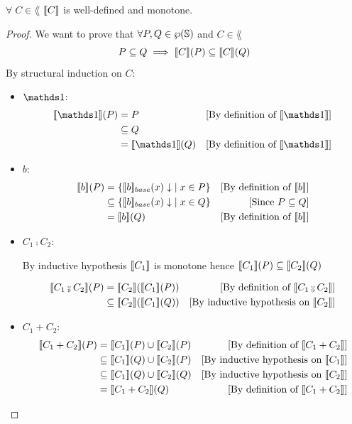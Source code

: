 \documentclass[
  10pt,       %
  twoside,    %
  a4paper,    %
  english,    %
  tikz,       %
  openright,  %
]{book}
\begin{document}
\begin{theorem}[Monotonicity]
  \label{thm:sem-mono}
  $\forall \; C \in \lang$ $\llbracket C \rrbracket$ is well-defined and monotone.
\end{theorem}
\begin{proof}
  We want to prove that $\forall P, Q \in \wp(\mathbb{S})$ and $C \in \lang$
  $$P \subseteq Q \implies \llbracket C \rrbracket(P) \subseteq \llbracket C \rrbracket(Q)$$
  By structural induction on $C$:
  \begin{itemize}
    \item $\sskip$:
      \begin{align*}
        \sem{\sskip}(P) 
          &= P
          & \text{[By definition of $\sem{\sskip}$]}\\
          &\subseteq Q \\
          &= \sem{\sskip}(Q) 
          & \text{[By definition of $\sem{\sskip}$]}\\
      \end{align*}

    \item $b$:
      \begin{align*}
        \llbracket b \rrbracket(P) 
          &= \{ \llbracket b \rrbracket_{base}(x)\downarrow \; \mid x \in P \} 
          & \text{[By definition of $\llbracket b \rrbracket$]}\\
          &\subseteq \{ \llbracket b \rrbracket_{base}(x)\downarrow \; \mid x \in Q \} 
          & \text{[Since $P \subseteq Q$]}\\
          &= \llbracket b \rrbracket(Q) 
          & \text{[By definition of $\llbracket b \rrbracket$]}\\
      \end{align*}

    \item $C_1 \fcmp C_2$:

      By inductive hypothesis $\llbracket C_1 \rrbracket$ is monotone hence
      $\llbracket C_1 \rrbracket(P) \subseteq \llbracket C_2 \rrbracket(Q)$

      \begin{align*}
        \sem{C_1 \fcmp C_2}(P) 
          &= \sem{C_2}(\sem{C_1}(P))
          &\text{[By definition of $\sem{C_1 \fcmp C_2}$]}\\
          &\subseteq \sem{C_2}(\sem{C_1}(Q))
          &\text{[By inductive hypothesis on $\sem{C_2}$]} \\
      \end{align*}
  
    \item $C_1 + C_2$:
      \begin{align*}
        \llbracket C_1 + C_2 \rrbracket(P) 
          &= \llbracket C_1 \rrbracket(P) \cup \llbracket C_2 \rrbracket(P)
          &\text{[By definition of $\llbracket C_1 + C_2 \rrbracket$]}\\
          &\subseteq \llbracket C_1 \rrbracket(Q) \cup \llbracket C_2 \rrbracket(P)
          &\text{[By inductive hypothesis on $\llbracket C_1 \rrbracket$]} \\
          &\subseteq \llbracket C_1 \rrbracket(Q) \cup \llbracket C_2 \rrbracket(Q)
          &\text{[By inductive hypothesis on $\llbracket C_2 \rrbracket$]} \\
          &= \llbracket C_1 + C_2 \rrbracket(Q) 
          &\text{[By definition of $\llbracket C_1 + C_2 \rrbracket$]}\\
      \end{align*}
    

\end{itemize}
\end{proof}
\end{document}
